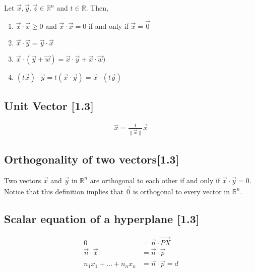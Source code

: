 \documentclass[a4paper,9pt]{extarticle}
\begin{document}
\begin{multicols*}{2}
Let $\vec{x}, \vec{y}, \vec{z} \in \mathbb{R}^n$ and $t \in \mathbb{R}$. Then,
\begin{enumerate}[label=\bfseries (\arabic*)] \itemsep0pt \parskip0pt 
    \item $\vec{x} \cdot \vec{x} \geq 0$ and $\vec{x} \cdot \vec{x} = 0$ if and only if $\vec{x} = \vec{0}$
    \item $\vec{x} \cdot \vec{y} = \vec{y} \cdot \vec{x}$
    \item $\vec{x} \cdot (\vec{y} + \vec{w}) = \vec{x} \cdot \vec{y} + \vec{x} \cdot \vec{w})$
    \item $(t \vec{x}) \cdot \vec{y} = t(\vec{x} \cdot \vec{y}) = \vec{x} \cdot (t \vec{y})$
\end{enumerate}


\subsection{Unit Vector [1.3]}
\begin{equation} \label{1.3-4}
    \begin{split}
        \hat{x} = \frac{1}{\|\vec{x}\|} \vec{x}
    \end{split}
\end{equation}


\subsection{Orthogonality of two vectors[1.3]}
Two vectors $\vec{x}$ and $\vec{y}$ in $\mathbb{R}^n$ are orthogonal to each other if and only if $\vec{x} \cdot \vec{y} = 0$. Notice that this definition implies that $\vec{0}$ is orthogonal to every vector in $\mathbb{R}^n$.


\subsection{Scalar equation of a hyperplane [1.3]}
\begin{equation} \label{1.3-5}
    \begin{split}
        0 & = \vec{n} \cdot \vec{PX} \\
        \vec{n} \cdot \vec{x} & = \vec{n} \cdot \vec{p} \\
        n_1 x_1 + ... + n_n x_n & = \vec{n} \cdot \vec{p} = d
    \end{split}
\end{equation}


\end{multicols*}
\end{document}
